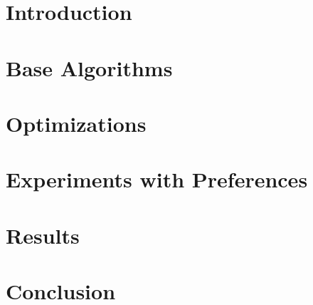 \chapter{Introduction}




\chapter{Base Algorithms}
\label{sec:algos}





\chapter{Optimizations}




\chapter{Experiments with Preferences}



\chapter{Results}
\label{chap:results}




\chapter{Conclusion}
